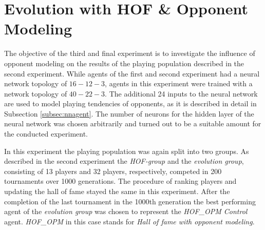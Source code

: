 \section{Evolution with HOF \& Opponent Modeling}
The objective of the third and final experiment is to investigate the influence of opponent modeling on the results of the playing population described in the second experiment. While agents of the first and second experiment had a neural network topology of $16-12-3$, agents in this experiment were trained with a network topology of $40-22-3$. The additional 24 inputs to the neural network are used to model playing tendencies of opponents, as it is described in detail in Subsection \ref{subsec:nnagent}. The number of neurons for the hidden layer of the neural network was chosen arbitrarily and turned out to be a suitable amount for the conducted experiment. \par
In this experiment the playing population was again split into two groups. As described in the second experiment the \textit{HOF-group} and the \textit{evolution group}, consisting of 13 players and 32 players, respectively, competed in 200 tournaments over 1000 generations. The procedure of ranking players and updating the hall of fame stayed the same in this experiment. After the completion of the last tournament in the 1000th generation the best performing agent of the \textit{evolution group} was chosen to represent the \textit{HOF\_OPM Control} agent. \textit{HOF\_OPM} in this case stands for \textit{Hall of fame with opponent modeling}.
